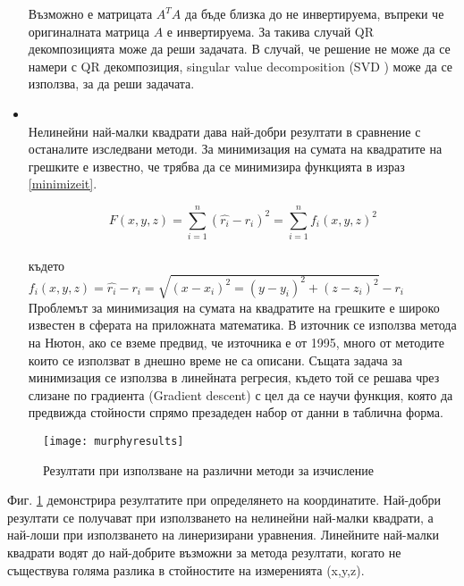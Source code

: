 \begin{itemize}
	Възможно е матрицата $A^T A$ да бъде близка до не инвертируема, въпреки че оригиналната матрица $A$ е инвертируема. За такива случай QR декомпозицията може да реши задачата. В случай, че решение не може да се намери с QR декомпозиция, singular value decomposition (SVD \cite{svd}) може да се използва, за да реши задачата.
	
    \item {}\\
	Нелинейни най-малки квадрати дава най-добри резултати в сравнение с останалите изследвани методи. За минимизация на сумата на квадратите на грешките е известно, че трябва да се минимизира функцията в израз \ref{minimizeit}.
	
	\begin{equation} \label{minimizeit}
		F(x,y,z)=\sum_{i=1}^{n} (\hat{r_i} - r_i)^2=\sum_{i=1}^{n} f_i(x,y,z)^2
	\end{equation}\\
	
	където \\
	
	$f_i(x,y,z)=\hat{r_i}- r_i= \sqrt{(x-x_i)^2 = (y-y_i)^2 + (z-z_i)^2} - r_i$
	\\
	
	Проблемът за минимизация на сумата на квадратите на грешките е широко известен в сферата на приложната математика. В източник \cite{murphy} се използва метода на Нютон, ако се вземе предвид, че източника е от 1995, много от методите които се използват в днешно време не са описани.  Същата задача за минимизация се използва в линейната регресия, където той се решава чрез слизане по градиента (Gradient descent) \cite{lreg} с цел да се научи функция, която да предвижда стойности спрямо презадеден набор от данни в таблична форма.
    
\end{itemize}



\begin{figure}
    \centering
    \texttt{[image: murphyresults]}
    \caption{Резултати при използване на различни методи за изчисление}
    \label{fig:murphyResults}
\end{figure}



Фиг. \ref{fig:murphyResults} демонстрира резултатите при определянето на координатите. Най-добри резултати се получават при използването на нелинейни най-малки квадрати, а най-лоши при използването на линеризирани уравнения. Линейните най-малки квадрати водят до най-добрите възможни за метода резултати, когато не съществува голяма разлика в стойностите на измеренията (x,y,z).